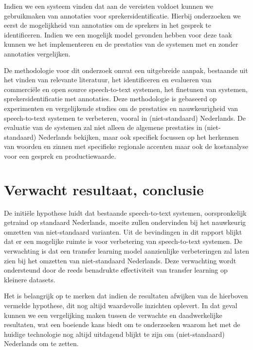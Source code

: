 \par Indien we een systeem vinden dat aan de vereisten voldoet kunnen we gebruikmaken van annotaties voor sprekersidentificatie. Hierbij onderzoeken we eerst de mogelijkheid van annotaties om de sprekers in het gesprek te identificeren. Indien we een mogelijk model gevonden hebben voor deze taak kunnen we het implementeren en de prestaties van de systemen met en zonder annotaties vergelijken.


\par De methodologie voor dit onderzoek omvat een uitgebreide aanpak, bestaande uit het vinden van relevante literatuur, het identificeren en evalueren van commerciële en open source speech-to-text systemen, het finetunen van systemen, sprekersidentificatie met annotaties. Deze methodologie is gebaseerd op experimenten en vergelijkende studies om de prestaties en nauwkeurigheid van speech-to-text systemen te verbeteren, vooral in (niet-standaard) Nederlands. De evaluatie van de systemen zal niet alleen de algemene prestaties in (niet-standaard) Nederlands bekijken, maar ook specifiek focussen op het herkennen van woorden en zinnen met specifieke regionale accenten maar ook de kostanalyse voor een gesprek en productiewaarde.

\section{Verwacht resultaat, conclusie}%
\label{sec:verwachte_resultaten}

De initiële hypothese luidt dat bestaande speech-to-text systemen, oorspronkelijk getraind op standaard Nederlands, moeite zullen ondervinden bij het nauwkeurig omzetten van niet-standaard varianten.
Uit de bevindingen in dit rapport blijkt dat er een mogelijke ruimte is voor verbetering van speech-to-text systemen. De verwachting is dat een transfer learning model aanzienlijke verbeteringen zal laten zien bij het omzetten van niet-standaard Nederlands. Deze verwachting wordt ondersteund door de reeds benadrukte effectiviteit van transfer learning op kleinere datasets.

Het is belangrijk op te merken dat indien de resultaten afwijken van de hierboven vermelde hypothese, dit nog altijd waardevolle inzichten oplevert. In dat geval kunnen we een vergelijking maken tussen de verwachte en daadwerkelijke resultaten, wat een boeiende kans biedt om te onderzoeken waarom het met de huidige technologie nog altijd uitdagend blijkt te zijn om (niet-standaard) Nederlands om te zetten.
